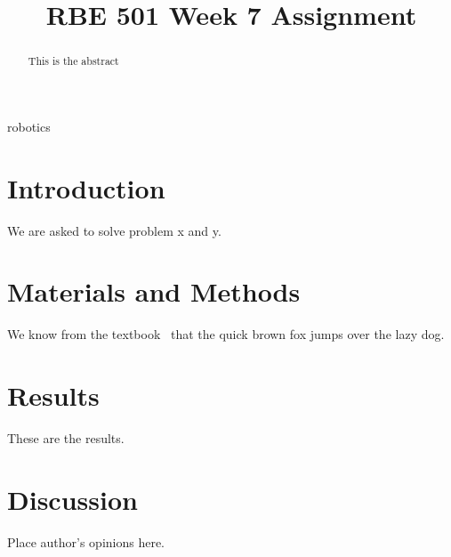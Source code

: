 \documentclass[conference]{IEEEtran}
\begin{document}
\title{RBE 501 Week 7 Assignment}

\author{
}

\maketitle

\begin{abstract}
This is the abstract
\end{abstract}

\begin{IEEEkeywords}
robotics
\end{IEEEkeywords}

\section{Introduction}
We are asked to solve problem x and y.

\section{Materials and Methods}

We know from the textbook~\cite{Spong2006} that the quick brown fox jumps over the lazy dog.

\section{Results}
These are the results.

\section{Discussion}

Place author's opinions here.


\end{document}
